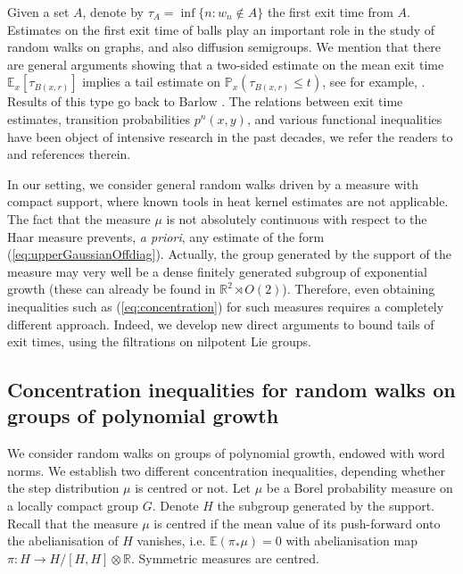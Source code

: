\documentclass[11pt,leqno]{article}
\theoremstyle{plain}
\theoremstyle{definition}
\theoremstyle{remark}
\numberwithin{equation}{section}
\newcommand{\R}{\mathbb{R}}
\newcommand{\E}{\mathbb{E}}
\begin{document}
Given a set $A$, denote by $\tau_A=\inf\{n: w_n\notin A\}$ the first exit time from $A$. Estimates on the first exit time of balls play an important role in the study of random walks on graphs, and also diffusion semigroups. We mention that there are general arguments showing that a two-sided estimate on the mean exit time $\mathbb{E}_x[\tau_{B(x,r)}]$ implies a tail estimate on $\mathbb{P}_x(\tau_{B(x,r)}\le t)$, see for example, \cite[Theorem 3.15]{GT}.  Results of this type go back to Barlow \cite{Barlow95}. The relations between exit time estimates, transition probabilities $p^{n}(x,y)$, and various functional inequalities have been object of intensive research in the past decades, we refer the readers to \cite{GT} and references therein. 

In our setting, we consider general random walks driven by a measure with compact support, where known tools in heat kernel estimates are not applicable. The fact that the measure $\mu$ is not absolutely continuous with respect to the Haar measure prevents, {\it a priori}, any estimate of the form (\ref{eq:upperGaussianOffdiag}). Actually, the group generated by the support of the measure may very well be a dense finitely generated subgroup of exponential growth (these can already be found in $\R^2\rtimes O(2)$).  Therefore, even obtaining inequalities such as (\ref{eq:concentration}) for such measures requires a completely different approach. Indeed, we develop new direct arguments to bound tails of exit times, using the filtrations on nilpotent Lie groups. 
 


\subsection{Concentration inequalities for random walks on groups of polynomial growth}


We consider random walks on groups of polynomial growth, endowed with word norms. We establish two different concentration inequalities, depending whether the step distribution $\mu$ is centred or not. Let $\mu$ be a Borel probability measure on a locally compact group $G$. Denote $H$ the subgroup generated by the support. Recall that the measure $\mu$ is centred if the mean value of its push-forward onto the abelianisation of $H$ vanishes, i.e. $\E(\pi_\ast\mu)=0$ with abelianisation map $\pi:H \to H/[H,H]\otimes \mathbb{R}$. Symmetric measures are centred.
\end{document}
